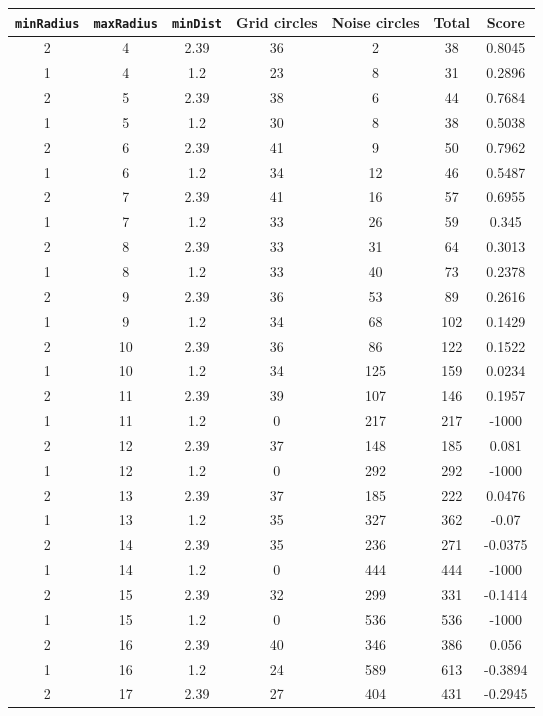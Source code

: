 \documentclass[letterpaper, 12pt]{article}
\begin{document}
\begin{longtable}{|c|c|c|c|c|c|c|}
\hline
\textbf{\texttt{minRadius}} & \textbf{\texttt{maxRadius}} & \textbf{\texttt{minDist}} & \textbf{Grid circles} & \textbf{Noise circles} & \textbf{Total} & \textbf{Score} \\
\hline
2 & 4 & 2.39 & 36 & 2 & 38 & 0.8045 \\
\hline
1 & 4 & 1.2 & 23 & 8 & 31 & 0.2896 \\
\hline
2 & 5 & 2.39 & 38 & 6 & 44 & 0.7684 \\
\hline
1 & 5 & 1.2 & 30 & 8 & 38 & 0.5038 \\
\hline
2 & 6 & 2.39 & 41 & 9 & 50 & 0.7962 \\
\hline
1 & 6 & 1.2 & 34 & 12 & 46 & 0.5487 \\
\hline
2 & 7 & 2.39 & 41 & 16 & 57 & 0.6955 \\
\hline
1 & 7 & 1.2 & 33 & 26 & 59 & 0.345 \\
\hline
2 & 8 & 2.39 & 33 & 31 & 64 & 0.3013 \\
\hline
1 & 8 & 1.2 & 33 & 40 & 73 & 0.2378 \\
\hline
2 & 9 & 2.39 & 36 & 53 & 89 & 0.2616 \\
\hline
1 & 9 & 1.2 & 34 & 68 & 102 & 0.1429 \\
\hline
2 & 10 & 2.39 & 36 & 86 & 122 & 0.1522 \\
\hline
1 & 10 & 1.2 & 34 & 125 & 159 & 0.0234 \\
\hline
2 & 11 & 2.39 & 39 & 107 & 146 & 0.1957 \\
\hline
1 & 11 & 1.2 & 0 & 217 & 217 & -1000 \\
\hline
2 & 12 & 2.39 & 37 & 148 & 185 & 0.081 \\
\hline
1 & 12 & 1.2 & 0 & 292 & 292 & -1000 \\
\hline
2 & 13 & 2.39 & 37 & 185 & 222 & 0.0476 \\
\hline
1 & 13 & 1.2 & 35 & 327 & 362 & -0.07 \\
\hline
2 & 14 & 2.39 & 35 & 236 & 271 & -0.0375 \\
\hline
1 & 14 & 1.2 & 0 & 444 & 444 & -1000 \\
\hline
2 & 15 & 2.39 & 32 & 299 & 331 & -0.1414 \\
\hline
1 & 15 & 1.2 & 0 & 536 & 536 & -1000 \\
\hline
2 & 16 & 2.39 & 40 & 346 & 386 & 0.056 \\
\hline
1 & 16 & 1.2 & 24 & 589 & 613 & -0.3894 \\
\hline
2 & 17 & 2.39 & 27 & 404 & 431 & -0.2945 \\

\end{longtable}
\end{document}
